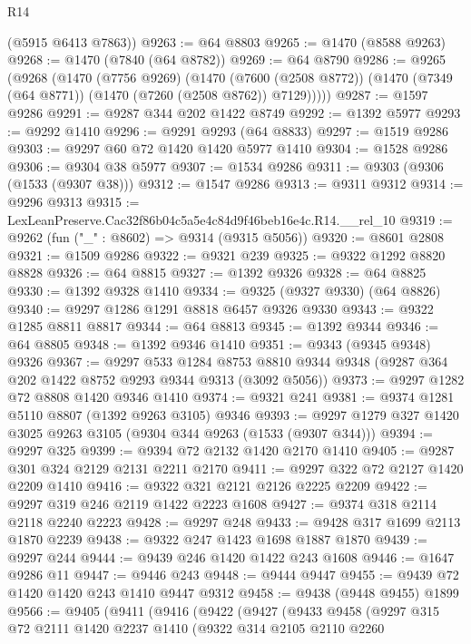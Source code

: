 \begin{lexlean}{R14}
\begin{coremodule}
      (@5915 @6413 @7863))
@9263 := @64 @8803
@9265 := @1470 (@8588 @9263)
@9268 := @1470 (@7840 (@64 @8782))
@9269 := @64 @8790
@9286 := @9265
    (@9268
      (@1470
        (@7756 @9269)
        (@1470
          (@7600 (@2508 @8772))
          (@1470 (@7349 (@64 @8771)) (@1470 (@7260 (@2508 @8762)) @7129)))))
@9287 := @1597 @9286
@9291 := @9287 @344 @202 @1422 @8749
@9292 := @1392 @5977
@9293 := @9292 @1410
@9296 := @9291 @9293 (@64 @8833)
@9297 := @1519 @9286
@9303 := @9297 @60 @72 @1420 @1420 @5977 @1410
@9304 := @1528 @9286
@9306 := @9304 @38 @5977
@9307 := @1534 @9286
@9311 := @9303 (@9306 (@1533 (@9307 @38)))
@9312 := @1547 @9286
@9313 := @9311 @9312
@9314 := @9296 @9313
@9315 := LexLeanPreserve.Cac32f86b04c5a5e4c84d9f46beb16e4c.R14.__rel_10
@9319 := @9262 (fun ("_" : @8602) => @9314 (@9315 @5056))
@9320 := @8601 @2808
@9321 := @1509 @9286
@9322 := @9321 @239
@9325 := @9322 @1292 @8820 @8828
@9326 := @64 @8815
@9327 := @1392 @9326
@9328 := @64 @8825
@9330 := @1392 @9328 @1410
@9334 := @9325 (@9327 @9330) (@64 @8826)
@9340 := @9297 @1286 @1291 @8818 @6457 @9326 @9330
@9343 := @9322 @1285 @8811 @8817
@9344 := @64 @8813
@9345 := @1392 @9344
@9346 := @64 @8805
@9348 := @1392 @9346 @1410
@9351 := @9343 (@9345 @9348) @9326
@9367 := @9297
    @533
    @1284
    @8753
    @8810
    @9344
    @9348
    (@9287 @364 @202 @1422 @8752 @9293 @9344 @9313 (@3092 @5056))
@9373 := @9297 @1282 @72 @8808 @1420 @9346 @1410
@9374 := @9321 @241
@9381 := @9374 @1281 @5110 @8807 (@1392 @9263 @3105) @9346
@9393 := @9297 @1279 @327 @1420 @3025 @9263 @3105 (@9304 @344 @9263 (@1533 (@9307 @344)))
@9394 := @9297 @325
@9399 := @9394 @72 @2132 @1420 @2170 @1410
@9405 := @9287 @301 @324 @2129 @2131 @2211 @2170
@9411 := @9297 @322 @72 @2127 @1420 @2209 @1410
@9416 := @9322 @321 @2121 @2126 @2225 @2209
@9422 := @9297 @319 @246 @2119 @1422 @2223 @1608
@9427 := @9374 @318 @2114 @2118 @2240 @2223
@9428 := @9297 @248
@9433 := @9428 @317 @1699 @2113 @1870 @2239
@9438 := @9322 @247 @1423 @1698 @1887 @1870
@9439 := @9297 @244
@9444 := @9439 @246 @1420 @1422 @243 @1608
@9446 := @1647 @9286 @11
@9447 := @9446 @243
@9448 := @9444 @9447
@9455 := @9439 @72 @1420 @1420 @243 @1410 @9447 @9312
@9458 := @9438 (@9448 @9455) @1899
@9566 := @9405
    (@9411
      (@9416
        (@9422
          (@9427
            (@9433
              @9458
              (@9297
                @315
                @72
                @2111
                @1420
                @2237
                @1410
                (@9322
                  @314
                  @2105
                  @2110
                  @2260

\end{coremodule}
\end{lexlean}
